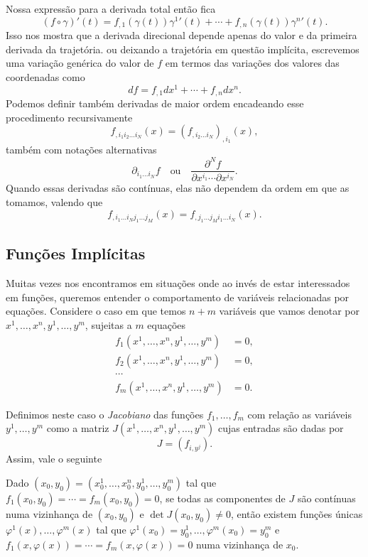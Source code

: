 Nossa expressão para a derivada total então fica
$$(f\circ\gamma)'(t)=f_{,1}(\gamma(t))\gamma^{1}{'}(t)
+\cdots+f_{,n}(\gamma(t))\gamma^{n}{'}(t).$$
Isso nos mostra que a derivada direcional depende apenas do valor e da primeira
derivada da trajetória. ou deixando a trajetória em questão implícita,
escrevemos uma variação genérica do valor de $f$ em termos das variações dos
valores das coordenadas como
$$df=f_{,1}dx^1+\cdots+f_{,n}dx^n.$$
Podemos definir também derivadas de maior ordem encadeando esse procedimento
recursivamente
$$f_{,i_1i_2\dots i_N}(x)=(f_{,i_2\dots i_N})_{,i_1}(x),$$
também com notações alternativas
$$\partial_{i_1\dots i_N} f\quad\text{ou}
\quad\frac{\partial^N f}{\partial x^{i_1}\cdots\partial x^{i_N}}.$$
Quando essas derivadas são contínuas, elas não dependem da ordem em que as
tomamos, valendo que
$$f_{,i_1\dots i_Nj_1\dots j_M}(x)=f_{,j_1\dots j_Mi_1\dots i_N}(x).$$

\subsection{Funções Implícitas}

Muitas vezes nos encontramos em situações onde ao invés de estar interessados em
funções, queremos entender o comportamento de variáveis relacionadas por
equações. Considere o caso em que temos $n+m$ variáveis que vamos denotar por
$x^1,\dots,x^n,y^1,\dots,y^m$, sujeitas a $m$ equações
\begin{align*}
    f_1(x^1,\dots,x^n,y^1,\dots,y^m)&=0,\\
    f_2(x^1,\dots,x^n,y^1,\dots,y^m)&=0,\\
    \cdots&\\
    f_m(x^1,\dots,x^n,y^1,\dots,y^m)&=0.
\end{align*}

Definimos neste caso o \emph{Jacobiano} das funções $f_1,\dots,f_m$ com relação
as variáveis $y^1,\dots,y^m$ como a matriz $J(x^1,\dots,x^n,y^1,\dots,y^m)$
cujas entradas são dadas por 
$$J=\left(f_{i,y^j}\right).$$
Assim, vale o seguinte 
\begin{theorem}
    Dado $(x_0,y_0)=(x^1_0,\dots,x^n_0,y^1_0,\dots,y^m_0)$ tal que $f_1(x_0,y_0)
    =\cdots=f_m(x_0,y_0)=0$, se todas as componentes de $J$ são contínuas numa
    vizinhança de $(x_0,y_0)$ e $\det J(x_0,y_0)\neq0$, então existem funções
    únicas $\varphi^1(x),\dots,\varphi^m(x)$ tal que $\varphi^1(x_0)=y^1_0,
    \dots, \varphi^m(x_0)=y^m_0$ e $f_1(x,\varphi(x))=\cdots=f_m(x,\varphi(x))
    =0$ numa vizinhança de $x_0$.
\end{theorem}

